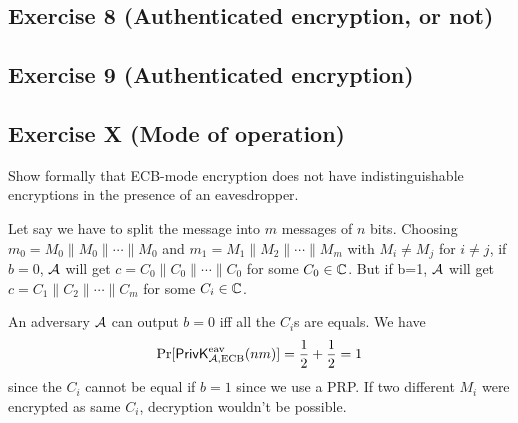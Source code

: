 \subsection{Exercise 8 (Authenticated encryption, or not)}




\subsection{Exercise 9 (Authenticated encryption)}




\subsection{Exercise X (Mode of operation)}
Show formally that ECB-mode encryption does not have indistinguishable encryptions in the presence of an eavesdropper.
\begin{solution}
  Let say we have to split the message into $m$ messages of $n$ bits.
  Choosing $m_0 = M_0 \| M_0 \| \cdots \| M_0$ and $m_1 = M_1 \| M_2 \| \cdots \| M_m$ with $M_i \neq M_j$ for $i \neq j$,
  if $b = 0$, $\mathcal{A}$ will get $c = C_0 \| C_0 \| \cdots \| C_0$ for some $C_0 \in \mathbb{C}$. But if b=1, $\mathcal{A}$ will get $c = C_1 \| C_2 \| \cdots \| C_m$ for some $C_i \in \mathbb{C}$.

  An adversary $\mathcal{A}$ can output $b = 0$ iff all the $C_i$s are equals.
  We have
  \[ \Pr[\mathsf{PrivK}^{\text{eav}}_{\mathcal{A},\text{ECB}}(nm)] = \frac{1}{2} + \frac{1}{2} = 1 \]
  since the $C_i$ cannot be equal if $b = 1$ since we use a PRP.
  If two different $M_i$ were encrypted as same $C_i$, decryption wouldn't be possible.
\end{solution}
